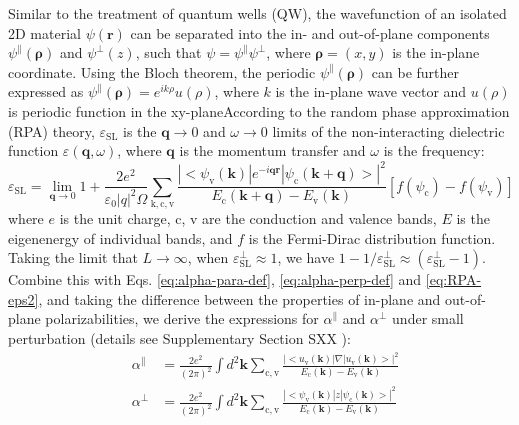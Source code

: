 \documentclass[journal=ancac3,manuscript=article,email=true,hyperref=true,keywords=false]{achemso}
\begin{document}
Similar to the treatment of quantum wells (QW), the wavefunction of an
isolated 2D material $\psi(\mathbf{r})$ can be separated into the in-
and out-of-plane components \cite{davies_physics_1997}
$\psi^{\parallel}(\mathbf{\rho})$ and $\psi^{\perp}(z)$, such that
$\psi=\psi^{\parallel}\psi^{\perp}$, where $\mathbf{\rho}=(x, y)$ is
the in-plane coordinate. Using the Bloch theorem, the periodic
$\psi^{\parallel}(\mathbf{\rho})$ can be further expressed as
$\psi^{\parallel}(\mathbf{\rho})=e^{ik\rho}u(\rho)$, where $k$ is the
in-plane wave vector and $u(\rho)$ is periodic function in the
xy-planeAccording to the random phase approximation (RPA)
theory\cite{Adler_1962}, $\varepsilon_{\mathrm{SL}}$ is the
$\mathbf{q} \to 0$ and $\omega \to 0$ limits of the non-interacting
dielectric function $\varepsilon(\mathbf{q}, \omega)$, where
$\mathbf{q}$ is the momentum transfer and $\omega$ is the frequency:
\begin{equation}
  \label{eq:RPA-eps2}
  \varepsilon_{\mathrm{SL}}
  = \lim_{\mathbf{q} \to 0} 1 + \frac{2e^{2}}{\varepsilon_{0} |q|^{2} \Omega}
  \sum_{\mathrm{k, c, v}}
  \frac{|<\psi_{\mathrm{v}}(\mathbf{k})|e^{-i\mathbf{q}\mathbf{r}}|\psi_{\mathrm{c}}(\mathbf{k+q})>|^{2}}
  {E_{\mathrm{c}}(\mathbf{k+q}) - E_{\mathrm{v}}(\mathbf{k})}
  \left[f(\psi_{\mathrm{c}}) - f(\psi_{\mathrm{v}})\right]
\end{equation}
where $e$ is the unit charge, c, v are the conduction and valence
bands, $E$ is the eigenenergy of individual bands, and $f$ is the
Fermi-Dirac distribution function. Taking the limit that $L\to\infty$,
when $\varepsilon^{\perp}_{\mathrm{SL}} \approx 1$, we have
$1-1/\varepsilon^{\perp}_{\mathrm{SL}} \approx
(\varepsilon_{\mathrm{SL}}^{\perp} - 1)$. Combine this with
Eqs. \ref{eq:alpha-para-def}, \ref{eq:alpha-perp-def} and
\ref{eq:RPA-eps2}, and taking the difference between the properties of
in-plane and out-of-plane polarizabilities, we derive the expressions
for $\alpha^{\parallel}$ and $\alpha^{\perp}$ under small perturbation
(details see Supplementary Section SXX ):
\begin{subequations}
  \begin{eqnarray}
  \label{eq:alpha_para_RPA}
  & \alpha^{\parallel} &= \frac{2e^{2}}
  {(2 \pi)^{2}} \int d^{2}\mathbf{k} \sum_{\mathrm{c, v}}
  \frac{|<u_{\mathrm{v}}(\mathbf{k})|\nabla|u_{\mathrm{v}}(\mathbf{k})>|^{2}}
                         {E_{\mathrm{c}}(\mathbf{k}) - E_{\mathrm{v}}(\mathbf{k})} \\
  \label{eq:alpha_perp_RPA}
  & \alpha^{\perp} &= \frac{2e^{2}}{(2 \pi) ^{2}} \int d^{2}\mathbf{k}
  \sum_{\mathrm{c, v}}
  \frac{|<\psi_{\mathrm{v}}(\mathbf{k})|z|\psi_{\mathrm{c}}(\mathbf{k})>|^{2}}
  {E_{\mathrm{c}}(\mathbf{k}) - E_{\mathrm{v}}(\mathbf{k})}
  \end{eqnarray}
\end{subequations}
\end{document}
